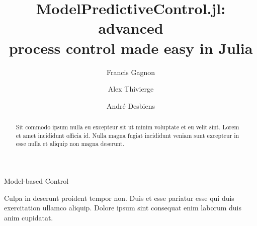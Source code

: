 \documentclass{ifacconf}
\begin{document}
\begin{frontmatter}

\title{ModelPredictiveControl.jl: advanced\\process control made easy in Julia}

\author[First]{Francis Gagnon} 
\author[First]{Alex Thivierge} 
\author[Second]{André Desbiens}

\address[First]{Jumine Inc., Quebec City, G1S 2K4, Canada}
\address[Second]{Process Observation and Optimization Laboratory (LOOP), Université Laval, Quebec City, G1V 0A6, Canada}

\begin{abstract} 
Sit commodo ipsum nulla eu excepteur sit ut minim voluptate et eu velit sint. Lorem et amet incididunt officia id. Nulla magna fugiat incididunt veniam sunt excepteur in esse nulla et aliquip non magna deserunt. 
\end{abstract}

\begin{keyword}
Model-based Control
\end{keyword}

\end{frontmatter}






\begin{ack}
Culpa in deserunt proident tempor non. Duis et esse pariatur esse qui duis exercitation ullamco aliquip. Dolore ipsum sint consequat enim laborum duis anim cupidatat.
\end{ack}


\end{document}
